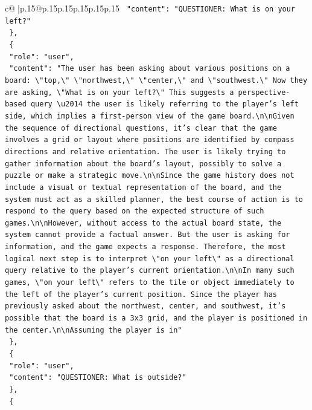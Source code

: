 \documentclass{article}
\begin{document}
{\begin{supertabular}{c@{$\;$}|p{.15\linewidth}@{}p{.15\linewidth}p{.15\linewidth}p{.15\linewidth}p{.15\linewidth}p{.15\linewidth}}
{{{\texttt{    "content": "QUESTIONER: What is on your left?"} \\
\texttt{  \},} \\
\texttt{  \{} \\
\texttt{    "role": "user",} \\
\texttt{    "content": "The user has been asking about various positions on a board: \textbackslash{}"top,\textbackslash{}" \textbackslash{}"northwest,\textbackslash{}" \textbackslash{}"center,\textbackslash{}" and \textbackslash{}"southwest.\textbackslash{}" Now they are asking, \textbackslash{}"What is on your left?\textbackslash{}" This suggests a perspective{-}based query \textbackslash{}u2014 the user is likely referring to the player's left side, which implies a first{-}person view of the game board.\textbackslash{}n\textbackslash{}nGiven the sequence of directional questions, it's clear that the game involves a grid or layout where positions are identified by compass directions and relative orientation. The user is likely trying to gather information about the board's layout, possibly to solve a puzzle or make a strategic move.\textbackslash{}n\textbackslash{}nSince the game history does not include a visual or textual representation of the board, and the system must act as a skilled planner, the best course of action is to respond to the query based on the expected structure of such games.\textbackslash{}n\textbackslash{}nHowever, without access to the actual board state, the system cannot provide a factual answer. But the user is asking for information, and the game expects a response. Therefore, the most logical next step is to interpret \textbackslash{}"on your left\textbackslash{}" as a directional query relative to the player's current orientation.\textbackslash{}n\textbackslash{}nIn many such games, \textbackslash{}"on your left\textbackslash{}" refers to the tile or object immediately to the left of the player's current position. Since the player has previously asked about the northwest, center, and southwest, it's possible that the board is a 3x3 grid, and the player is positioned in the center.\textbackslash{}n\textbackslash{}nAssuming the player is in"} \\
\texttt{  \},} \\
\texttt{  \{} \\
\texttt{    "role": "user",} \\
\texttt{    "content": "QUESTIONER: What is outside?"} \\
\texttt{  \},} \\
\texttt{  \{} \\
}}}
\end{supertabular}}
\end{document}
